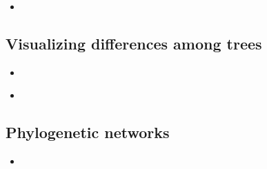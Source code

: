 \documentclass[compress, ucs, xelatex, 11pt, xcolor=x11names, aspectratio=1609,
	hyperref={
		bookmarks=true,
		unicode=true,
		colorlinks=true,
		pdftitle={HybSeq course},
		plainpages=false,
		pdfauthor={Vojtech Zeisek},
		pdfsubject={Practical processing of HybSeq target enrichment sequencing data on computing grids like MetaCentrum},
		pdfcreator={XeLaTeX},
		pdfkeywords={BASH, command line, GNU, HybSeq, Linux, MetaCentrum, sequencing shell, target enrichment},
		linkcolor=Cyan2, %
		anchorcolor=Firebrick2, %
		citecolor=Firebrick2, %
		filecolor=Firebrick2, %
		menucolor=Firebrick2, %
		urlcolor=Chartreuse2, %
		pdftex},
	url={hyphens, lowtilde} %
	]{beamer}
\begin{document}
\begin{frame}[fragile]{}
	\begin{itemize}
		\item 
	\end{itemize}
	\begin{spluscode}
    
	\end{spluscode}
	\begin{bashcode}
    
	\end{bashcode}
\end{frame}

\subsection{Visualizing differences among trees}

\begin{frame}[fragile]{}
	\begin{itemize}
		\item 
	\end{itemize}
	\begin{spluscode}
    
	\end{spluscode}
	\begin{bashcode}
    
	\end{bashcode}
\end{frame}

\begin{frame}[fragile]{}
	\begin{itemize}
		\item 
	\end{itemize}
	\begin{spluscode}
    
	\end{spluscode}
	\begin{bashcode}
    
	\end{bashcode}
\end{frame}

\subsection{Phylogenetic networks}

\begin{frame}[fragile]{}
	\begin{itemize}
		\item 
	\end{itemize}
	\begin{spluscode}
    
	\end{spluscode}
	\begin{bashcode}
    
	\end{bashcode}
\end{frame}
\end{document}
